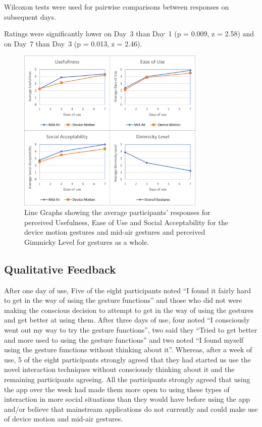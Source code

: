 \documentclass{l4proj}
\begin{document}
Wilcoxon tests were used for pairwise comparisons between responses on subsequent days.

Ratings were significantly lower on Day~3 than Day~1 (p = 0.009, z = 2.58) and on Day~7 than Day~3 (p = 0.013, z = 2.46).



\begin{figure}[h!]
    \centering
    \includegraphics[width=0.8\textwidth]{images/Combined Preceptions.png}
        \caption{Line Graphs showing the average participants' responses for perceived Usefulness, Ease of Use and Social Acceptability for the device motion gestures and mid-air gestures and perceived Gimmicky Level for gestures as a whole.}
        \label{fig:perceptions}
\end{figure}

\subsection{Qualitative Feedback}

After one day of use, Five of the eight participants noted ``I found it fairly hard to get in the way of using the gesture functions'' and those who did not were making the conscious decision to attempt to get in the way of using the gestures and get better at using them. After three days of use, four noted ``I consciously went out my way to try the gesture functions'', two said they ``Tried to get better and more used to using the gesture functions'' and two noted ``I found myself using the gesture functions without thinking about it''. Whereas, after a week of use, 5 of the eight participants strongly agreed that they had started us use the novel interaction techniques without consciously thinking about it and the remaining participants agreeing. All the participants strongly agreed that using the app over the week had made them more open to using these types of interaction in more social situations than they would have before using the app and/or believe that mainstream applications do not currently and could make use of device motion and mid-air gestures.
\end{document}
